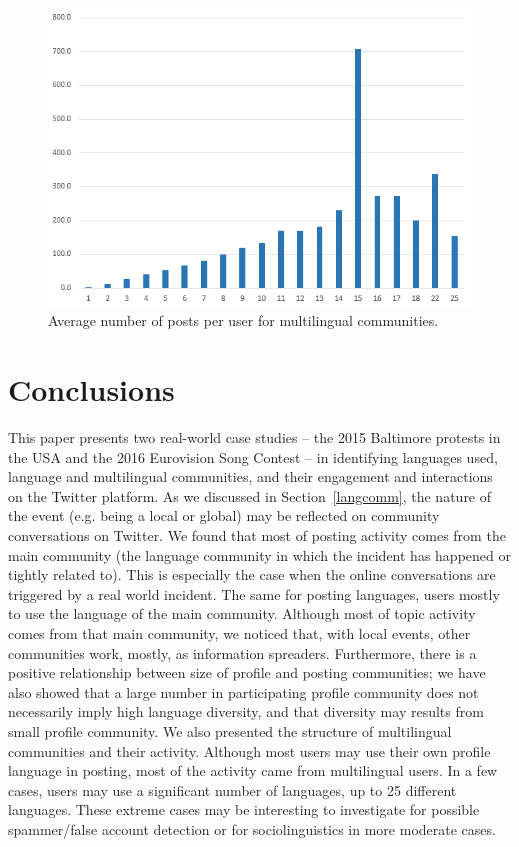 \begin{figure}[htb]
\centering
\includegraphics[width=\columnwidth]{images/multilingualpostsperuser.png}
\caption{Average number of posts per user for multilingual communities.}
\label{fig:multilingualpostsperuser}
\end{figure}


\section{Conclusions}\label{conclusions}

This paper presents two real-world case studies -- the 2015 Baltimore
protests in the USA and the 2016 Eurovision Song Contest -- in
identifying languages used, language and multilingual communities, and
their engagement and interactions on the Twitter platform. As we
discussed in Section~\ref{langcomm}, the nature of the event
(e.g. being a local or global) may be reflected on community
conversations on Twitter. We found that most of posting activity comes
from the main community (the language community in which the incident
has happened or tightly related to). This is especially the case when
the online conversations are triggered by a real world incident. The
same for posting languages, users mostly to use the language of the
main community. Although most of topic activity comes from that main
community, we noticed that, with local events, other communities work,
mostly, as information spreaders. Furthermore, there is a positive
relationship between size of profile and posting communities; we have
also showed that a large number in participating profile community
does not necessarily imply high language diversity, and that diversity
may results from small profile community. We also presented the
structure of multilingual communities and their activity. Although
most users may use their own profile language in posting, most of the
activity came from multilingual users. In a few cases, users may use a
significant number of languages, up to 25 different languages. These
extreme cases may be interesting to investigate for possible
spammer/false account detection or for sociolinguistics in more
moderate cases.

